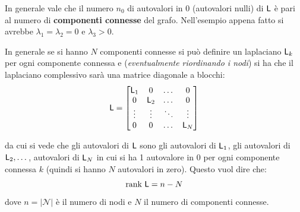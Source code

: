 In generale vale che il numero $n_0$ di autovalori in 0 (autovalori nulli) di $\mathsf{L}$ \`e pari al numero di \textbf{componenti connesse} del grafo.
Nell'esempio appena fatto si avrebbe $\lambda_1 = \lambda_2 = 0$ e $\lambda_3 > 0$.

In generale se si hanno $N$ componenti connesse si pu\`o definire un laplaciano $\mathsf{L}_k$ per ogni componente connessa e (\textit{eventualmente riordinando i nodi}) si ha che il laplaciano complessivo sar\`a una matrice diagonale a blocchi:
\begin{equation}
\mathsf{L} = \begin{bmatrix}
\mathsf{L}_1 & 0 & \dots & 0 \\
0 & \mathsf{L}_2 & \dots & 0 \\
\vdots & \vdots & \ddots & \vdots \\
0 & 0 & \dots & \mathsf{L}_N
\end{bmatrix}
\end{equation}

da cui si vede che gli autovalori di $\mathsf{L}$ sono gli autovalori di $\mathsf{L}_1$, gli autovalori di $\mathsf{L}_2, \dots$, autovalori di $\mathsf{L}_N$ in cui si ha 1 autovalore in 0 per ogni componente connessa $k$ (quindi si hanno $N$ autovalori in zero). Questo vuol dire che:
\begin{equation}
\text{rank }\mathsf{L} = n - N
\end{equation}
dove $n = |\mathcal{N}|$ \`e il numero di nodi e $N$ il numero di componenti connesse.

